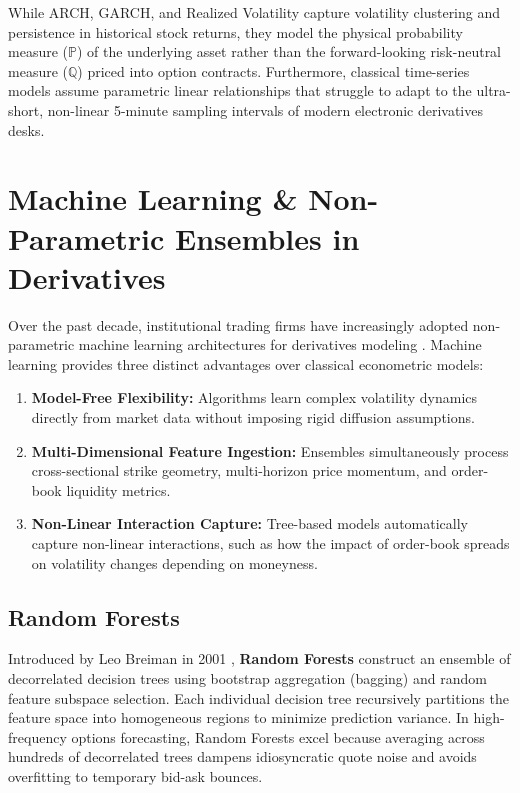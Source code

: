 While ARCH, GARCH, and Realized Volatility capture volatility clustering and persistence in historical stock returns, they model the physical probability measure ($\mathbb{P}$) of the underlying asset rather than the forward-looking risk-neutral measure ($\mathbb{Q}$) priced into option contracts. Furthermore, classical time-series models assume parametric linear relationships that struggle to adapt to the ultra-short, non-linear 5-minute sampling intervals of modern electronic derivatives desks.

\section{Machine Learning \& Non-Parametric Ensembles in Derivatives}
\label{sec:ml_in_derivatives}

Over the past decade, institutional trading firms have increasingly adopted non-parametric machine learning architectures for derivatives modeling \cite{lopez2018advances}. Machine learning provides three distinct advantages over classical econometric models:
\begin{enumerate}\setlength{\itemsep}{0pt}\setlength{\parskip}{0pt}
    \item \textbf{Model-Free Flexibility:} Algorithms learn complex volatility dynamics directly from market data without imposing rigid diffusion assumptions.
    \item \textbf{Multi-Dimensional Feature Ingestion:} Ensembles simultaneously process cross-sectional strike geometry, multi-horizon price momentum, and order-book liquidity metrics.
    \item \textbf{Non-Linear Interaction Capture:} Tree-based models automatically capture non-linear interactions, such as how the impact of order-book spreads on volatility changes depending on moneyness.
\end{enumerate}

\subsection{Random Forests}
Introduced by Leo Breiman in 2001 \cite{breiman2001random}, \textbf{Random Forests} construct an ensemble of decorrelated decision trees using bootstrap aggregation (bagging) and random feature subspace selection. Each individual decision tree recursively partitions the feature space into homogeneous regions to minimize prediction variance. In high-frequency options forecasting, Random Forests excel because averaging across hundreds of decorrelated trees dampens idiosyncratic quote noise and avoids overfitting to temporary bid-ask bounces.


